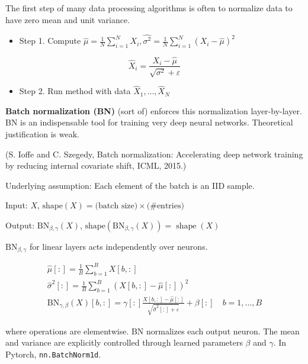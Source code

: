 \documentclass{report}
\begin{document}
\begin{concept}
    The first step of many data processing algorithms is often to normalize data to have zero mean and unit variance.

    \begin{itemize}
        \item Step 1. Compute $\hat{\mu}=\frac{1}{N} \sum_{i=1}^{N} X_{i}, \widehat{\sigma^{2}}=\frac{1}{N} \sum_{i=1}^{N}\left(X_{i}-\hat{\mu}\right)^{2}$
    \end{itemize}

    $$
    \hat{X}_{i}=\frac{X_{i}-\widehat{\mu}}{\sqrt{\sigma^{2}}+\varepsilon}
    $$

    \begin{itemize}
        \item Step 2. Run method with data $\hat{X}_{1}, \ldots, \hat{X}_{N}$
    \end{itemize}

    \textbf{Batch normalization (BN)} (sort of) enforces this normalization layer-by-layer. BN is an indispensable tool for training very deep neural networks. Theoretical justification is weak.

    (S. Ioffe and C. Szegedy, Batch normalization: Accelerating deep network training by reducing internal covariate shift, ICML, 2015.)
\end{concept}

\begin{definition}
    Underlying assumption: Each element of the batch is an IID sample.

    Input: $X$, $\text{shape}(X) = \text{(batch size)} \times \text{(\# entries)}$

    Output: $\mathrm{BN}_{\beta, \gamma}(X)$, $\text{shape} \left(\mathrm{BN}_{\beta, \gamma}(X)\right)=\operatorname{shape}(X)$

    $\mathrm{BN}_{\beta, \gamma}$ for linear layers acts independently over neurons.

    $$
    \begin{gathered}
    \hat{\mu}[:]=\frac{1}{B} \sum_{b=1}^{B} X[b,:]\\
    \hat{\sigma}^{2}[:]=\frac{1}{B} \sum_{b=1}^{B}(X[b,:]-\hat{\mu}[:])^{2} \\
    \mathrm{BN}_{\gamma, \beta}(X)[b,:]=\gamma[:] \frac{X[b,:]-\hat{\mu}[:]}{\sqrt{\hat{\sigma}^{2}[:]+\varepsilon}}+\beta[:] \quad b=1, \ldots, B
    \end{gathered}
    $$

    where operations are elementwise. BN normalizes each output neuron. The mean and variance are explicitly controlled through learned parameters $\beta$ and $\gamma$. In Pytorch, \verb|nn.BatchNorm1d|.
\end{definition}
\end{document}

